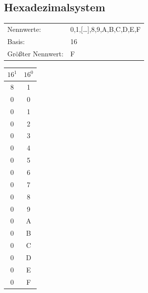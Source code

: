 \documentclass[12pt,a4paper]{article}
\begin{document}
    \begin{minipage}{.49\textwidth}
        \vspace{0.5cm}
        
        \subsection{Hexadezimalsystem}
            \begin{tabularx}{9cm}{XX}
                Nennwerte:&0,1,[\dots],8,9,A,B,C,D,E,F\\
                Basis:&16\\
                Größter Nennwert:&F\\
            \end{tabularx}
            \begin{center}
            	\footnotesize
                \begin{tabular}{|c|c|}
                    \hline

                    $16^1$ & $16^0$ \\
                    \hline
                    8     & 1      \\
                    \hline
                    \hline
                    0      & 0      \\
                    0      & 1      \\
                    0      & 2      \\
                    0      & 3      \\
                    0      & 4      \\
                    0      & 5      \\
                    0      & 6      \\
                    0      & 7      \\
                    0      & 8      \\
                    0      & 9      \\
                    0      & A      \\
                    0      & B      \\
                    0      & C      \\
                    0      & D      \\
                    0      & E      \\
                    0      & F      \\
                    \hline
                \end{tabular}
            \end{center}
    \end{minipage}
\end{document}
